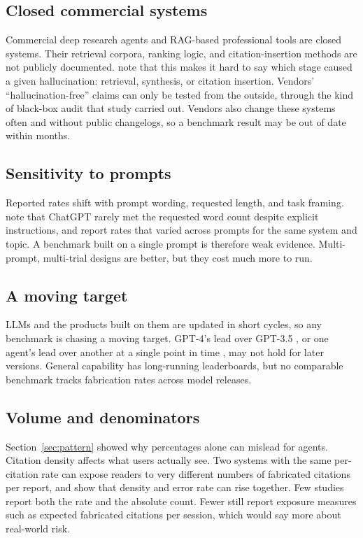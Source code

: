 \documentclass[acmsmall,screen]{acmart}
\begin{document}
\subsection{Closed commercial systems}
Commercial deep research agents and RAG-based professional tools are closed systems. Their retrieval corpora, ranking logic, and citation-insertion methods are not publicly documented. \citet{magesh2025} note that this makes it hard to say which stage caused a given hallucination: retrieval, synthesis, or citation insertion. Vendors' ``hallucination-free'' claims can only be tested from the outside, through the kind of black-box audit that study carried out. Vendors also change these systems often and without public changelogs, so a benchmark result may be out of date within months.

\subsection{Sensitivity to prompts}
Reported rates shift with prompt wording, requested length, and task framing. \citet{walters2023} note that ChatGPT rarely met the requested word count despite explicit instructions, and \citet{bhattacharyya2023} report rates that varied across prompts for the same system and topic. A benchmark built on a single prompt is therefore weak evidence. Multi-prompt, multi-trial designs are better, but they cost much more to run.

\subsection{A moving target}
LLMs and the products built on them are updated in short cycles, so any benchmark is chasing a moving target. GPT-4's lead over GPT-3.5 \citep{walters2023}, or one agent's lead over another at a single point in time \citep{du2025}, may not hold for later versions. General capability has long-running leaderboards, but no comparable benchmark tracks fabrication rates across model releases.

\subsection{Volume and denominators}\label{sec:volume}
Section~\ref{sec:pattern} showed why percentages alone can mislead for agents. Citation density affects what users actually see. Two systems with the same per-citation rate can expose readers to very different numbers of fabricated citations per report, and \citet{rao2026} show that density and error rate can rise together. Few studies report both the rate and the absolute count. Fewer still report exposure measures such as expected fabricated citations per session, which would say more about real-world risk.
\end{document}
